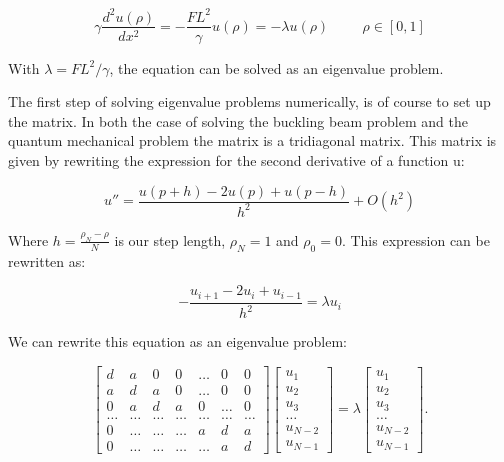 \documentclass[norsk,a4paper,12pt]{article}
\begin{document}
\begin{equation}
\gamma \frac{d^2 u(\rho)}{dx^2}=-\frac{FL^2}{\gamma}u(\rho)=-\lambda u(\rho)  \hspace{1cm}  \rho \in [0,1]
 \label{eq:de2}
 \end{equation}

With $\lambda=FL^2/\gamma$, the equation can be solved as an eigenvalue problem.

The first step of solving eigenvalue problems numerically, is of course to set up the matrix. In both the case of solving the buckling beam problem and the quantum mechanical problem the matrix is a tridiagonal matrix. This matrix is given by rewriting the expression for the second derivative of a function u:

$$
u'' = \frac{u(p+h)-2u(p) + u(p-h)}{h^2} + O(h^2)
$$

Where $h=\frac{\rho_N-\rho}{N}$ is our step length, $\rho_N=1$ and $\rho_0=0$. This expression can be rewritten as:

$$
-\frac{u_{i+1}-2u_i+u_{i-1}}{h^2}=\lambda u_i
$$

We can rewrite this equation as an eigenvalue problem:

\begin{equation}
    \begin{bmatrix} d& a & 0   & 0    & \dots  &0     & 0 \\
                                a & d & a & 0    & \dots  &0     &0 \\
                                0   & a & d & a  &0       &\dots & 0\\
                                \dots  & \dots & \dots & \dots  &\dots      &\dots & \dots\\
                                0   & \dots & \dots & \dots  &a  &d & a\\
                                0   & \dots & \dots & \dots  &\dots       &a & d\end{bmatrix} 
                                 \begin{bmatrix} u_1 \\ u_2 \\ u_3 \\ \dots \\ u_{N-2} \\ u_{N-1}\end{bmatrix} = \lambda \begin{bmatrix} u_1 \\ u_2 \\ u_3 \\ \dots \\ u_{N-2} \\ u_{N-1}\end{bmatrix} . 
\label{eq:matrix} 
\end{equation}
\end{document}
